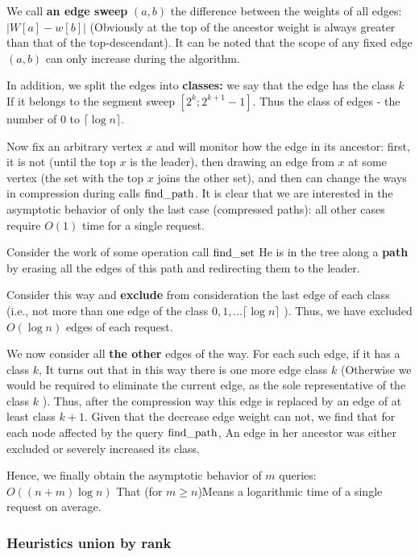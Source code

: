 We call \textbf{an edge sweep} $(a, b)$ the difference between the weights of all edges: $| W [a] - w [b] |$ (Obviously at the top of the ancestor weight is always greater than that of the top-descendant). It can be noted that the scope of any fixed edge $(a, b)$ can only increase during the algorithm.

In addition, we split the edges into \textbf{classes:} we say that the edge has the class $k$ If it belongs to the segment sweep $[2 ^ k; 2 ^ {k +1} -1]$. Thus the class of edges - the number of $0$ to $\lceil \log n \rceil$.

Now fix an arbitrary vertex $x$ and will monitor how the edge in its ancestor: first, it is not (until the top $x$ is the leader), then drawing an edge from $x$ at some vertex (the set with the top $x$ joins the other set), and then can change the ways in compression during calls ${\rm find \_path}$. It is clear that we are interested in the asymptotic behavior of only the last case (compressed paths): all other cases require $O (1)$ time for a single request.

Consider the work of some operation call ${\rm find \_set}$ He is in the tree along a \textbf{path} by erasing all the edges of this path and redirecting them to the leader.

Consider this way and \textbf{exclude} from consideration the last edge of each class (i.e., not more than one edge of the class $0, 1, \ldots \lceil \log n \rceil$ ). Thus, we have excluded $O (\log n)$ edges of each request.

We now consider all \textbf{the other} edges of the way. For each such edge, if it has a class $k$, It turns out that in this way there is one more edge class $k$ (Otherwise we would be required to eliminate the current edge, as the sole representative of the class $k$ ). Thus, after the compression way this edge is replaced by an edge of at least class $k +1$. Given that the decrease edge weight can not, we find that for each node affected by the query $\rm find \_path$, An edge in her ancestor was either excluded or severely increased its class.

Hence, we finally obtain the asymptotic behavior of $m$ queries: $O ((n + m) \log n)$ That (for $m \ge n$)Means a logarithmic time of a single request on average.

\subsubsection{ Heuristics union by rank }

